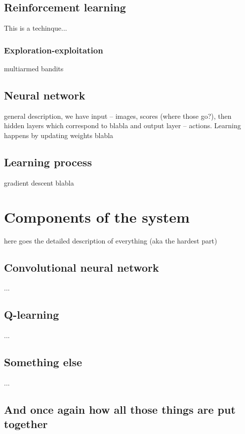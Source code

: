 \documentclass[a4paper,12pt]{article}
\begin{document}
\subsection{Reinforcement learning}
This is a techinque... 

\subsubsection{Exploration-exploitation}
multiarmed bandits

\subsection{Neural network}
general description, we have input -- images, scores (where those go?), then hidden layers which correspond to blabla and output layer -- actions. Learning happens by updating weights blabla

\subsection{Learning process}
gradient descent blabla



%
%
\pagebreak
\section{Components of the system}
here goes the detailed description of everything (aka the hardest part)

\subsection{Convolutional neural network}
...

\subsection{Q-learning}
...

\subsection{Something else}
...


\subsection{And once again how all those things are put together}



%
%
\pagebreak
\end{document}

